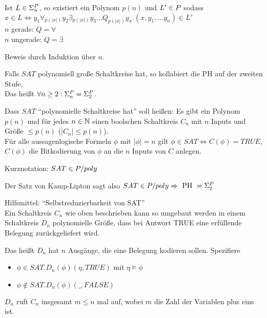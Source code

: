\begin{satz}
    
    Ist $L \in \Sigma_n^{P}$, so existiert ein Polynom $p(n)$ und $L' \in P$ sodass\\
     $x \in L \Leftrightarrow y_1 \forall_{p(|x|)} y_2 \exists_{p(|x|)} y_3 \dots   Q_{p(|x|)} y_n . (x, y_1, \dots y_n) \in L'$\\
    $n$ gerade: $Q = \forall$\\
    $n$ ungerade: $Q = \exists$

\end{satz}

Beweis durch Induktion über $n$.











\begin{satz}


    Falls $SAT$ polynomiell große Schaltkreise hat, so kollabiert die PH auf der zweiten Stufe.\\
    Das heißt $\forall n \geq 2 : \Sigma_n^{P} = \Sigma_2^{P}$.


    Dass $SAT$ ``polynomielle Schaltkreise hat'' soll heißen: Es gibt ein Polynom $p(n)$ und für jedes $n \in \mathbb{N}$ einen boolschen Schaltkreis $C_n$ mit $n$ Inputs und Größe $\leq p(n)$ ($|C_n| \leq p(n)$).\\
    Für alle aussagenlogische Formeln $\phi$ mit $|\phi| = n$ gilt $\phi \in SAT \Leftrightarrow C(\phi) = TRUE$, $C(\phi)$ die Bitkodierung von $\phi$ an die $n$ Inputs von $C$ anlegen.
    
\end{satz}

Kurznotation: $SAT \in P / poly$

Der Satz von Kamp-Lipton sagt also $SAT \in P / poly \Rightarrow \text{ PH } = \Sigma_2^{P}$

Hilfsmittel: ``Selbstreduzierbarkeit von SAT''\\
Ein Schaltkreis $C_n$ wie oben beschrieben kann so umgebaut werden in einem Schaltkreis $D_n$ polynomielle Größe, dass bei Antwort TRUE eine erfüllende Belegung zurückgeliefert wird.

Das heißt $D_n$ hat $n$ Ausgänge, die eine Belegung kodieren sollen. Spezifiere 
\begin{itemize}
    \item 
        $\phi \in SAT . D_n(\phi) (\eta, TRUE)$ mit $\eta \vDash \phi$
    \item 
        $\phi \notin SAT . D_n(\phi) (\_, FALSE)$
\end{itemize}
$D_n$ ruft $C_n$ insgesamt $m \leq n$ mal auf, wobei $m$ die Zahl der Variablen plus eins ist.





